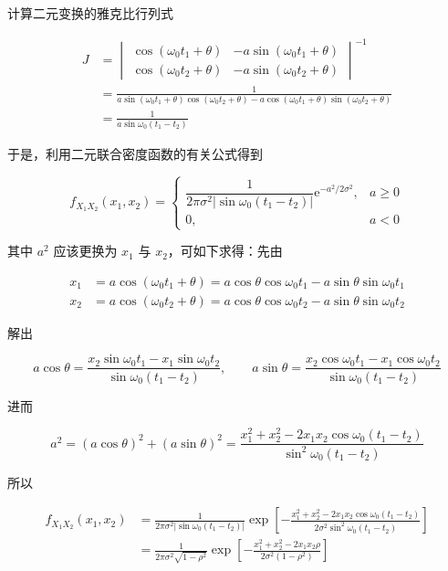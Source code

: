 \documentclass[11pt,openany,UTF8]{ctexbook}
\newcommand{\eu}{\mathrm{e}}                       %
\begin{document}
计算二元变换的雅克比行列式

\[
\begin{aligned}
J &= \begin{vmatrix}
  \cos(\omega_0 t_1+\theta) & -a\sin(\omega_0 t_1+\theta)\\[2pt]
  \cos(\omega_0 t_2+\theta) & -a\sin(\omega_0 t_2+\theta)
\end{vmatrix}^{-1}\\
&= \frac{1}{a\sin(\omega_0 t_1+\theta)\cos(\omega_0 t_2+\theta)
  - a\cos(\omega_0 t_1+\theta)\sin(\omega_0 t_2+\theta)}\\
&= \frac{1}{a\sin\omega_0(t_1-t_2)}
\end{aligned}
\]

于是\nobreak，利用二元联合密度函数的有关公式得到

\[
f_{X_1X_2}(x_1,x_2) =
\begin{cases}
\dfrac{1}{2\pi\sigma^2\lvert\sin\omega_0(t_1-t_2)\rvert}\eu^{-a^2/2\sigma^2},
  & a\geqslant 0\\[10pt]
0, & a<0
\end{cases}
\]

其中 $a^2$ 应该更换为 $x_1$ 与 $x_2$\nobreak，可如下求得\nobreak：先由

\[
\begin{aligned}
x_1 &= a\cos(\omega_0 t_1+\theta)
     = a\cos\theta\cos\omega_0 t_1 - a\sin\theta\sin\omega_0 t_1\\
x_2 &= a\cos(\omega_0 t_2+\theta)
     = a\cos\theta\cos\omega_0 t_2 - a\sin\theta\sin\omega_0 t_2
\end{aligned}
\]

解出

\[
a\cos\theta = \frac{x_2\sin\omega_0 t_1 - x_1\sin\omega_0 t_2}{\sin\omega_0(t_1-t_2)},
\qquad
a\sin\theta = \frac{x_2\cos\omega_0 t_1 - x_1\cos\omega_0 t_2}{\sin\omega_0(t_1-t_2)}
\]

进而

\[
a^2 = (a\cos\theta)^2 + (a\sin\theta)^2
    = \frac{x_1^2+x_2^2-2x_1x_2\cos\omega_0(t_1-t_2)}{\sin^2\omega_0(t_1-t_2)}
\]

所以

\[
\begin{aligned}
f_{X_1X_2}(x_1,x_2)
&= \frac{1}{2\pi\sigma^2\lvert\sin\omega_0(t_1-t_2)\rvert}
   \exp\left[-\frac{x_1^2+x_2^2-2x_1x_2\cos\omega_0(t_1-t_2)}
   {2\sigma^2\sin^2\omega_0(t_1-t_2)}\right]\\
&= \frac{1}{2\pi\sigma^2\sqrt{1-\rho^2}}
   \exp\left[-\frac{x_1^2+x_2^2-2x_1x_2\rho}{2\sigma^2(1-\rho^2)}\right]
\end{aligned}
\]
\end{document}
